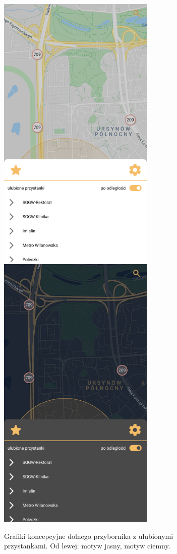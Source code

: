 \documentclass{SGGW-thesis}
\begin{document}
\begin{figure}
  \centering
  \includegraphics[width=75mm]{koncepty/screen_day_home_menu_click}
  \enspace
  \includegraphics[width=75mm]{koncepty/screen_night_home_menu_click}
  \caption[Dolny przybornik]{
    \label{koncept.dolny_przybornik}
    Grafiki koncepcyjne dolnego przybornika z ulubionymi przystankami. Od lewej: motyw jasny, motyw ciemny. \vspace{2ex}
  }
\end{figure}
\end{document}
